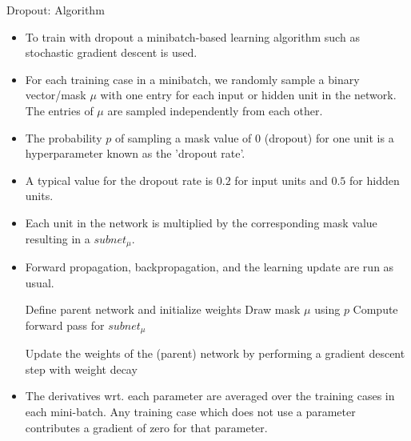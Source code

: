\begin{vbframe}{Dropout: Algorithm}
  \begin{itemize}
    \item To train with dropout a minibatch-based learning algorithm such as stochastic gradient descent is used.  
    \item For each training case in a minibatch, we randomly sample a binary vector/mask $\mu$ with one entry for each input or hidden unit in the network. The entries of $\mu$ are sampled independently from each other. 
    \item The probability $p$ of sampling a mask value of 0 (dropout) for one unit is a hyperparameter known as the 'dropout rate'. 
    \item A typical value for the dropout rate is $0.2$ for input units and $0.5$ for hidden units. 
    \item Each unit in the network is multiplied by the corresponding mask value resulting in a $subnet_{\mu}$. 
    \item Forward propagation, backpropagation, and the learning update are run as usual.
  \framebreak
  \begin{algorithm}[H]
  \footnotesize
  \caption{Training a (parent) neural network with dropout rate $p$}
    \begin{algorithmic}[1]
      \State Define parent network and initialize weights
        \State Draw mask $\mu$ using $p$
        \State Compute forward pass for $subnet_{\mu}$
        \EndFor
        \State \parbox[t]{\dimexpr\linewidth-\algorithmicindent}{Update the weights of the (parent) network by performing a gradient descent step with weight decay}
      \EndFor
    \end{algorithmic}
  \end{algorithm}
    \item The derivatives wrt. each parameter are averaged over the training cases in each mini-batch. Any training case which does not use a parameter contributes a gradient of zero for that parameter.
      \end{itemize}
\end{vbframe}

